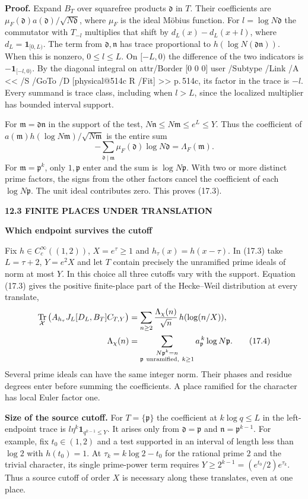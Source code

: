 \documentclass[11pt,letterpaper]{article}
\makeatletter
\newcommand{\rightmarktext}{}
\newcommand{\printfolio}{}
\newcommand{\leaf}[4]{\clearpage\gdef\printfolio{#1}\gdef\rightmarktext{#2}%
  {\small\sffamily\bfseries\color{ink}#3\par}\vspace{3pt}%
  {\LARGE\bfseries #4\par}\vspace{5pt}}
\newcommand{\point}[1]{\par\smallskip\textbf{#1.}\enspace\ignorespaces}
\DeclareMathOperator{\Tr}{Tr}
\newcommand{\MusicPDFPageRef}[1]{\pdfpageref\csname physical@#1\endcsname\space\space 0 R}
\newcommand{\pagelink}[2]{\leavevmode\pdfstartlink attr{/Border [0 0 0]} user{%
  /Subtype /Link /A << /S /GoTo /D [\MusicPDFPageRef{#1} /Fit] >>}%
  {\color{ink}#2}\pdfendlink}
\newcommand{\pg}[1]{\pagelink{#1}{p.\,#1}}
\makeatother
\begin{document}
\point{Proof} Expand $B_T$ over squarefree products $\mathfrak d$ in $T$.
Their coefficients are $\mu_F(\mathfrak d)a(\mathfrak d)/\sqrt{N\mathfrak d}$,
where $\mu_F$ is the ideal M\"obius function. For $l=\log N\mathfrak d$
the commutator with $T_{-l}$ multiplies that shift by
$d_L(x)-d_L(x+l)$, where $d_L=\mathbf1_{[0,L)}$.
The term from $\mathfrak d,\mathfrak n$ has trace proportional to
$h(\log N(\mathfrak d\mathfrak n))$. When this is nonzero, $0\le l\le L$.
On $[-L,0)$ the difference of the two indicators is
$-\mathbf1_{[-l,0)}$. By the diagonal integral on \pg{514c}, its factor
in the trace is $-l$. Every summand is trace class, including when
$l>L$, since the localized multiplier has bounded interval support.

For $\mathfrak m=\mathfrak d\mathfrak n$ in the support of the test,
$N\mathfrak n\le N\mathfrak m\le e^L\le Y$. Thus the coefficient of
$a(\mathfrak m)h(\log N\mathfrak m)/\sqrt{N\mathfrak m}$ is the entire sum
\[
       -\sum_{\mathfrak d\mid\mathfrak m}\mu_F(\mathfrak d)\log N\mathfrak d
       =\Lambda_F(\mathfrak m).
\]
For $\mathfrak m=\mathfrak p^k$, only $1,\mathfrak p$ enter and the sum is
$\log N\mathfrak p$. With two or more distinct prime factors, the signs
from the other factors cancel the coefficient of each $\log N\mathfrak p$.
The unit ideal contributes zero. This proves (17.3).

\leaf{514e}{Moving norm support}{12.3 \quad FINITE PLACES UNDER TRANSLATION}{Which endpoint survives the cutoff}
Fix $h\in C_c^\infty((1,2))$, $X=e^\tau\ge1$ and $h_\tau(x)=h(x-\tau)$.
In (17.3) take $L=\tau+2$, $Y=e^2X$ and let $T$ contain precisely the
unramified prime ideals of norm at most $Y$. In this choice all three
cutoffs vary with the support. Equation (17.3) gives the positive
finite-place part of the Hecke--Weil distribution at every translate,
\begin{align*}
 \Tr_{\mathcal X}\big(A_{h_\tau}J_L[D_L,B_T]C_{T,Y}\big)
      &=\sum_{n\ge2}\frac{\Lambda_\chi(n)}{\sqrt n}\,h(\log(n/X)),\\
 \Lambda_\chi(n)&=
   \sum_{\substack{N\mathfrak p^k=n\\ \mathfrak p\ {\rm unramified},\ k\ge1}}
             a_{\mathfrak p}^{\,k}\log N\mathfrak p .
 \tag{17.4}
\end{align*}
Several prime ideals can have the same integer norm. Their phases and
residue degrees enter before summing the coefficients. A place ramified
for the character has local Euler factor one.

\point{Size of the source cutoff}
For $T=\{\mathfrak p\}$ the coefficient at $k\log q\le L$ in the
left-endpoint trace is $l\eta^k\mathbf1_{q^{k-1}\le Y}$. It arises
only from $\mathfrak d=\mathfrak p$ and $\mathfrak n=\mathfrak p^{k-1}$.
For example, fix $t_0\in(1,2)$ and a test supported in an interval of
length less than $\log 2$ with $h(t_0)=1$. At
$\tau_k=k\log 2-t_0$ for the rational prime $2$ and the trivial
character, its single prime-power term requires
$Y\ge 2^{k-1}=(e^{t_0}/2)e^{\tau_k}$. Thus a source cutoff of order $X$
is necessary along these translates, even at one place.
\end{document}
